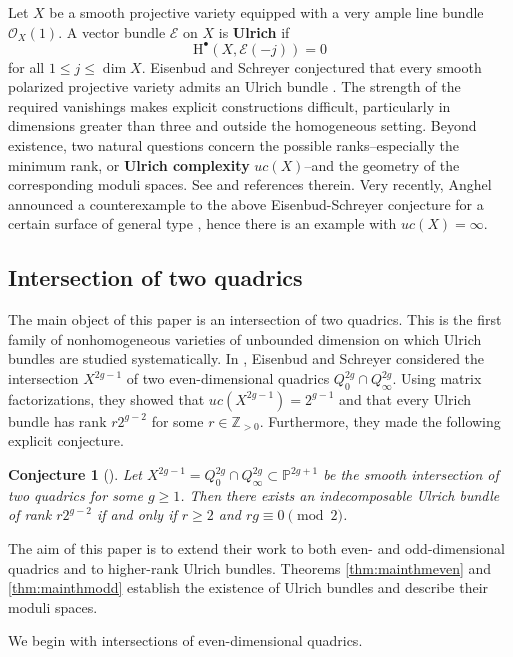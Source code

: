 \documentclass[12pt, letterpaper]{amsart}
\newtheorem{conjecture}[theorem]{Conjecture}
\theoremstyle{definition}
\newcommand{\PP}{\mathbb{P} }
\newcommand{\ZZ}{\mathbb{Z} }
\newcommand{\cE}{\mathcal{E} }
\newcommand{\cO}{\mathcal{O} }
\newcommand{\rH}{\mathrm{H} }
\begin{document}
Let \(X\) be a smooth projective variety equipped with a very ample line bundle \(\cO_X(1)\). A vector bundle \(\cE\) on \(X\) is \textbf{Ulrich} if
\[\rH^\bullet(X, \cE(-j)) = 0\]
for all \(1 \le j \le \dim X\). Eisenbud and Schreyer conjectured that every smooth polarized projective variety admits an Ulrich bundle \cite{ES03}. The strength of the required vanishings makes explicit constructions difficult, particularly in dimensions greater than three and outside the homogeneous setting. Beyond existence, two natural questions concern the possible ranks--especially the minimum rank, or \textbf{Ulrich complexity} \(uc(X)\)--and the geometry of the corresponding moduli spaces. See \cite{CFK23, CFK24, CMRPL21} and references therein. Very recently, Anghel announced a counterexample to the above Eisenbud-Schreyer conjecture for a certain surface of general type \cite{Ang26}, hence there is an example with \(uc(X) = \infty\).

\subsection{Intersection of two quadrics}

The main object of this paper is an intersection of two quadrics. This is the first family of nonhomogeneous varieties of unbounded dimension on which Ulrich bundles are studied systematically. In \cite{ES25}, Eisenbud and Schreyer considered the intersection \(X^{2g-1}\) of two even-dimensional quadrics \(Q_0^{2g} \cap Q_{\infty}^{2g}\). Using matrix factorizations, they showed that \(uc(X^{2g-1}) = 2^{g-1}\) and that every Ulrich bundle has rank \(r2^{g-2}\) for some \(r \in \ZZ_{> 0}\). Furthermore, they made the following explicit conjecture.

\begin{conjecture}[]\label{conj:ESquadrics}
Let \(X^{2g-1} = Q_0^{2g} \cap Q_{\infty}^{2g} \subset \PP^{2g+1}\) be the smooth intersection of two quadrics for some \(g \ge 1\). Then there exists an indecomposable Ulrich bundle of rank \(r2^{g-2}\) if and only if \(r \ge 2\) and \(rg \equiv 0 \pmod{2}\).
\end{conjecture}

The aim of this paper is to extend their work to both even- and odd-dimensional quadrics and to higher-rank Ulrich bundles. Theorems \ref{thm:mainthmeven} and \ref{thm:mainthmodd} establish the existence of Ulrich bundles and describe their moduli spaces.

We begin with intersections of even-dimensional quadrics.
\end{document}

